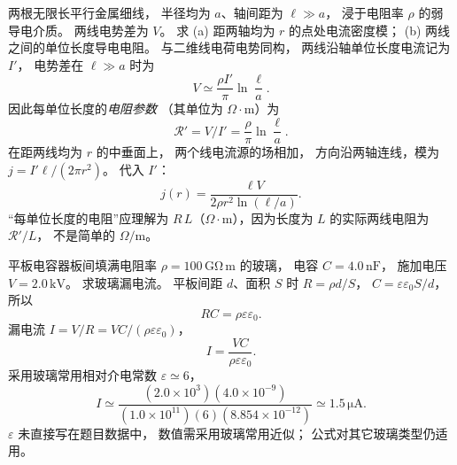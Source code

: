 两根无限长平行金属细线，
半径均为 $a$、轴间距为 $\ell\gg a$，
浸于电阻率 $\rho$ 的弱导电介质。
两线电势差为 $V$。
求 (a) 距两轴均为 $r$ 的点处电流密度模；
(b) 两线之间的单位长度导电电阻。
\exsolution
与二维线电荷电势同构，
两线沿轴单位长度电流记为 $I'$，
电势差在 $\ell\gg a$ 时为
\[
V\simeq\frac{\rho I'}{\pi}\ln\frac{\ell}{a}.
\]
因此每单位长度的\emph{电阻参数}
（其单位为 $\Omega\cdot\mathrm m$）为
\[
\boxed{\mathcal R'=V/I'
=\frac{\rho}{\pi}\ln\frac{\ell}{a}}.
\]
在距两线均为 $r$ 的中垂面上，
两个线电流源的场相加，
方向沿两轴连线，模为
$j=I'\ell/(2\pi r^2)$。
代入 $I'$：
\[
\boxed{j(r)=
\frac{\ell V}{2\rho r^2\ln(\ell/a)}}.
\]
\excheck “每单位长度的电阻”应理解为
$R\,L$（$\Omega\cdot$m），因为长度为
$L$ 的实际两线电阻为 $\mathcal R'/L$，
不是简单的 $\Omega/\mathrm m$。

平板电容器板间填满电阻率
$\rho=100\,\mathrm{G\Omega\,m}$ 的玻璃，
电容 $C=4.0\,\mathrm{nF}$，
施加电压 $V=2.0\,\mathrm{kV}$。
求玻璃漏电流。
\exsolution
平板间距 $d$、面积 $S$ 时
$R=\rho d/S$，
$C=\varepsilon\varepsilon_0S/d$，
所以
\[
\boxed{RC=\rho\varepsilon\varepsilon_0}.
\]
漏电流
$I=V/R=VC/(\rho\varepsilon\varepsilon_0)$，
\[
\boxed{I=\frac{VC}{\rho\varepsilon\varepsilon_0}}.
\]
采用玻璃常用相对介电常数
$\varepsilon\simeq6$，
\[
\boxed{I\simeq
\frac{(2.0\times10^3)(4.0\times10^{-9})}
{(1.0\times10^{11})(6)(8.854\times10^{-12})}
\simeq1.5\,\mathrm{\mu A}}.
\]
\excheck $\varepsilon$ 未直接写在题目数据中，
数值需采用玻璃常用近似；
公式对其它玻璃类型仍适用。
